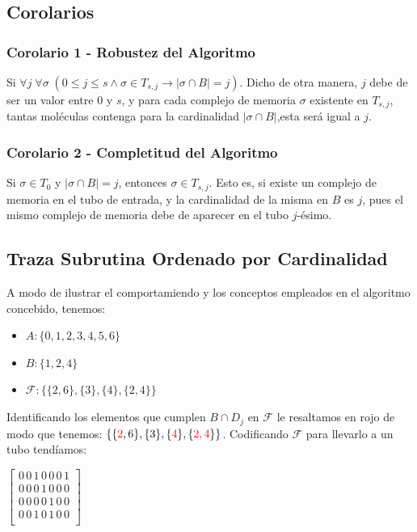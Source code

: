 \documentclass[12pt, letterpaper, twoside]{article}
\begin{document}
    \subsection{Corolarios}

    \subsubsection{Corolario 1 - Robustez del Algoritmo}
    Si $\forall{j}\;\forall\sigma\;(0\leq j \leq s \land \sigma\in T_{s,j} \rightarrow |\sigma\cap B| = j)$. Dicho de otra manera, $j$ debe de ser un valor entre $0$ y $s$, y para cada complejo de memoria $\sigma$ existente en $T_{s,j}$, tantas moléculas contenga para la cardinalidad $|\sigma\cap B|$,esta será igual a $j$. 
    \subsubsection{Corolario 2 - Completitud del Algoritmo}
    Si $\sigma\in T_0$ y $|\sigma\cap B| = j$, entonces $\sigma\in T_{s,j}$. Esto es, si existe un complejo de memoria en el tubo de entrada, y la cardinalidad de la misma en $B$ es $j$, pues el mismo complejo de memoria debe de aparecer en el tubo $j$-ésimo.

    \newpage
    \subsection{Traza Subrutina Ordenado por Cardinalidad}
    A modo de ilustrar el comportamiendo y los conceptos empleados en el algoritmo concebido, tenemos:
    \begin{itemize}
        \item $A: \{0, 1, 2, 3, 4, 5, 6\}$
        \item $B: \{1, 2, 4\}$
        \item $\mathcal{F}: \{\{2, 6\}, \{3\}, \{4\}, \{2, 4\}\}$
    \end{itemize}
    Identificando los elementos que cumplen $B\cap D_j$ en $\mathcal{F}$ le resaltamos en rojo de modo que tenemos: $\{\{\textcolor{red}{2}, 6\}, \{3\}, \{\textcolor{red}{4}\}, \{\textcolor{red}{2, 4}\}\}$. Codificando $\mathcal{F}$ para llevarlo a un tubo tendíamos: 


    $
        \begin{bmatrix}
            0\,0\,1\,0\,0\,0\,1 \\
            0\,0\,0\,1\,0\,0\,0 \\
            0\,0\,0\,0\,1\,0\,0 \\
            0\,0\,1\,0\,1\,0\,0 \\
        \end{bmatrix}
    $ 
\end{document}
